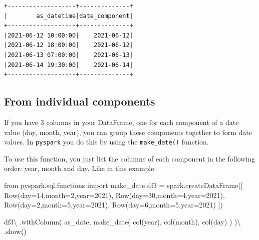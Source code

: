 \documentclass[
  11pt,
  letterpaper,
  DIV=11,
  numbers=noendperiod]{scrreprt}
\newenvironment{Shaded}{\begin{snugshade}}{\end{snugshade}}
\newcommand{\DecValTok}[1]{\textcolor[rgb]{0.68,0.00,0.00}{#1}}
\newcommand{\ImportTok}[1]{\textcolor[rgb]{0.00,0.46,0.62}{#1}}
\newcommand{\NormalTok}[1]{\textcolor[rgb]{0.00,0.23,0.31}{#1}}
\newcommand{\OperatorTok}[1]{\textcolor[rgb]{0.37,0.37,0.37}{#1}}
\newcommand{\StringTok}[1]{\textcolor[rgb]{0.13,0.47,0.30}{#1}}
\begin{document}
\begin{verbatim}
+-------------------+--------------+
|        as_datetime|date_component|
+-------------------+--------------+
|2021-06-12 10:00:00|    2021-06-12|
|2021-06-12 18:00:00|    2021-06-12|
|2021-06-13 07:00:00|    2021-06-13|
|2021-06-14 19:30:00|    2021-06-14|
+-------------------+--------------+
\end{verbatim}

\hypertarget{from-individual-components}{%
\subsection{From individual
components}\label{from-individual-components}}

If you have 3 columns in your DataFrame, one for each component of a
date value (day, month, year), you can group these components together
to form date values. In \texttt{pyspark} you do this by using the
\texttt{make\_date()} function.

To use this function, you just list the columns of each component in the
following order: year, month and day. Like in this example:

\begin{Shaded}
\begin{Highlighting}[]
\ImportTok{from}\NormalTok{ pyspark.sql.functions }\ImportTok{import}\NormalTok{ make\_date}
\NormalTok{df3 }\OperatorTok{=}\NormalTok{ spark.createDataFrame([}
\NormalTok{    Row(day}\OperatorTok{=}\DecValTok{14}\NormalTok{,month}\OperatorTok{=}\DecValTok{2}\NormalTok{,year}\OperatorTok{=}\DecValTok{2021}\NormalTok{),}
\NormalTok{    Row(day}\OperatorTok{=}\DecValTok{30}\NormalTok{,month}\OperatorTok{=}\DecValTok{4}\NormalTok{,year}\OperatorTok{=}\DecValTok{2021}\NormalTok{),}
\NormalTok{    Row(day}\OperatorTok{=}\DecValTok{2}\NormalTok{,month}\OperatorTok{=}\DecValTok{5}\NormalTok{,year}\OperatorTok{=}\DecValTok{2021}\NormalTok{),}
\NormalTok{    Row(day}\OperatorTok{=}\DecValTok{6}\NormalTok{,month}\OperatorTok{=}\DecValTok{5}\NormalTok{,year}\OperatorTok{=}\DecValTok{2021}\NormalTok{)}
\NormalTok{])}

\NormalTok{df3}\OperatorTok{\textbackslash{}}
\NormalTok{    .withColumn(}
        \StringTok{\textquotesingle{}as\_date\textquotesingle{}}\NormalTok{,}
\NormalTok{        make\_date(}
\NormalTok{            col(}\StringTok{\textquotesingle{}year\textquotesingle{}}\NormalTok{),}
\NormalTok{            col(}\StringTok{\textquotesingle{}month\textquotesingle{}}\NormalTok{),}
\NormalTok{            col(}\StringTok{\textquotesingle{}day\textquotesingle{}}\NormalTok{)}
\NormalTok{        )}
\NormalTok{    )}\OperatorTok{\textbackslash{}}
\NormalTok{    .show()}
\end{Highlighting}
\end{Shaded}
\end{document}

